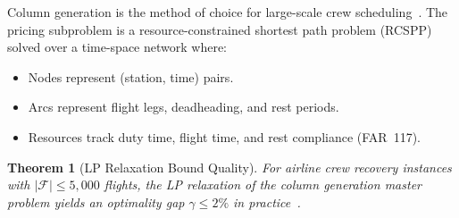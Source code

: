 \documentclass[11pt,a4paper]{book}
\newtheorem{theorem}{Theorem}[chapter]
\theoremstyle{definition}
\begin{document}
\medskip
\noindent{}\medskip

Column generation is the method of choice for large-scale crew
scheduling~\cite{Desaulniers2006}. The pricing subproblem is a
resource-constrained shortest path problem (RCSPP) solved over
a time-space network where:
\begin{itemize}
  \item Nodes represent (station, time) pairs.
  \item Arcs represent flight legs, deadheading, and rest periods.
  \item Resources track duty time, flight time, and rest compliance (FAR~117).
\end{itemize}

\begin{theorem}[LP Relaxation Bound Quality]
For airline crew recovery instances with $|\mathcal{F}| \leq 5{,}000$ flights,
the LP relaxation of the column generation master problem yields an
optimality gap $\gamma \leq 2\%$ in practice~\cite{Desaulniers2006}.
\end{theorem}
\end{document}
